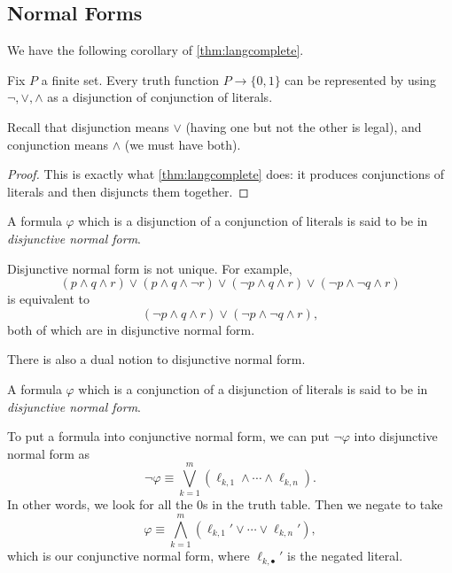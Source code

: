 \documentclass[../notes.tex]{subfiles}
\begin{document}
\subsection{Normal Forms}
We have the following corollary of \autoref{thm:langcomplete}.
\begin{corollary} \label{cor:dnf}
	Fix $P$ a finite set. Every truth function $P\to\{0,1\}$ can be represented by using $\lnot,\lor,\land$ as a disjunction of conjunction of literals.
\end{corollary}
Recall that disjunction means $\lor$ (having one but not the other is legal), and conjunction means $\land$ (we must have both).
\begin{proof}
	This is exactly what \autoref{thm:langcomplete} does: it produces conjunctions of literals and then disjuncts them together.
\end{proof}
\begin{definition}
	A formula $\varphi$ which is a disjunction of a conjunction of literals is said to be in \textit{disjunctive normal form}.
\end{definition}
\begin{example}
	Disjunctive normal form is not unique. For example,
	\[(p\land q\land r)\lor(p\land q\land\lnot r)\lor(\lnot p\land q\land r)\lor(\lnot p\land\lnot q\land r)\]
	is equivalent to
	\[(\lnot p\land q\land r)\lor(\lnot p\land\lnot q\land r),\]
	both of which are in disjunctive normal form.
\end{example}
There is also a dual notion to disjunctive normal form.
\begin{definition}
	A formula $\varphi$ which is a conjunction of a disjunction of literals is said to be in \textit{disjunctive normal form}.
\end{definition}
To put a formula into conjunctive normal form, we can put $\lnot\varphi$ into disjunctive normal form as
\[\lnot\varphi\equiv\bigvee_{k=1}^m(\ell_{k,1}\land\cdots\land\ell_{k,n}).\]
In other words, we look for all the $0$s in the truth table. Then we negate to take
\[\varphi\equiv\bigwedge_{k=1}^m(\ell_{k,1}'\lor\cdots\lor\ell_{k,n}'),\]
which is our conjunctive normal form, where $\ell_{k,\bullet}'$ is the negated literal.
\end{document}
